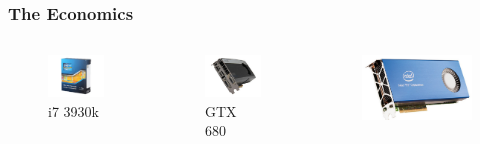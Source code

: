 \documentclass[12pt]{beamer}
\begin{document}
\begin{frame}
\frametitle{The Economics}
\begin{columns}
\begin{figure}
\includegraphics[width=\textwidth]{img/i73930k}
\caption{i7 3930k}
\end{figure}
\begin{figure}
\includegraphics[width=\textwidth]{img/gtx680}
\caption{GTX 680}
\end{figure}
\begin{figure}
\includegraphics[width=\textwidth]{img/phi5110p}

\end{figure}
\end{columns}
\end{frame}
\end{document}
